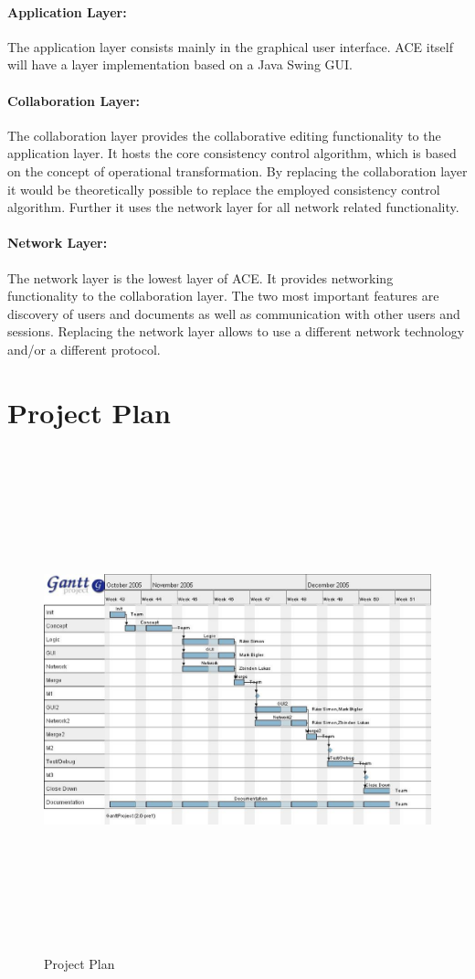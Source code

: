 \documentclass[11pt,a4paper]{article}
\begin{document}
\paragraph{Application Layer:} The application layer consists mainly in the graphical
user interface. ACE itself will have a layer implementation based on a Java Swing GUI.

\paragraph{Collaboration Layer:} The collaboration layer provides the collaborative
editing functionality to the application layer. It hosts the core consistency
control algorithm, which is based on the concept of operational transformation.
By replacing the collaboration layer it would be theoretically possible to replace
the employed consistency control algorithm. Further it uses the network layer
for all network related functionality.

\paragraph{Network Layer:} The network layer is the lowest layer of ACE. It provides
networking functionality to the collaboration layer. The two most important features
are discovery of users and documents as well as communication with other users and
sessions. Replacing the network layer allows to use a different network technology 
and/or a different protocol.


\section{Project Plan}

\begin{figure}[H]
 \includegraphics[height=413pt,width=585pt,angle=90]{../images/gantt.eps}
 \caption{Project Plan}
\end{figure}
\newpage
\end{document}
